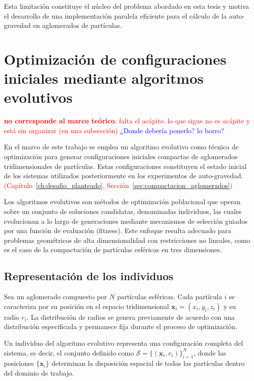 \documentclass[a4paper,11pt]{book}
\newcommand{\red}[1]{\textcolor{red}{#1}}
\newcommand{\blue}[1]{\textcolor{blue}{#1}}
\begin{document}
Esta limitación constituye el núcleo del problema abordado en esta tesis y motiva el desarrollo de una implementación paralela eficiente para el cálculo de la auto-gravedad en aglomerados de partículas.


\section{Optimización de configuraciones iniciales mediante algoritmos evolutivos}
\label{sec:alg_evolutivo}

\red{\textbf{no corresponde al marco teórico}. falta el acápite. lo que sigue no es acápite y está sin organizar (en una subsección)}
\blue{¿Donde debería ponerlo? lo borro?}


En el marco de este trabajo se emplea un algoritmo evolutivo como técnica de optimización para generar configuraciones iniciales compactas de aglomerados tridimensionales de partículas. Estas configuraciones constituyen el estado inicial de los sistemas utilizados posteriormente en los experimentos de auto-gravedad.
\red{(Capítulo~\ref{ch:desafio_planteado}, Sección~\ref{sec:compactacion_aglomerados})}

Los algoritmos evolutivos son métodos de optimización poblacional que operan sobre un conjunto de soluciones candidatas, denominadas individuos, las cuales evolucionan a lo largo de generaciones mediante mecanismos de selección guiados por una función de evaluación (fitness). Este enfoque resulta adecuado para problemas geométricos de alta dimensionalidad con restricciones no lineales, como es el caso de la compactación de partículas esféricas en tres dimensiones.

\subsection{Representación de los individuos}

Sea un aglomerado compuesto por $N$ partículas esféricas. Cada partícula $i$ se caracteriza por su posición en el espacio tridimensional $\mathbf{x}_i = (x_i, y_i, z_i)$ y su radio $r_i$. La distribución de radios se genera previamente de acuerdo con una distribución especificada y permanece fija durante el proceso de optimización.

Un individuo del algoritmo evolutivo representa una configuración completa del sistema, es decir, el conjunto definido como $\mathcal{S} = \{(\mathbf{x}_i, r_i)\}_{i=1}^{N}$, donde las posiciones $\{\mathbf{x}_i\}$ determinan la disposición espacial de todas las partículas dentro del dominio de trabajo.
\end{document}
